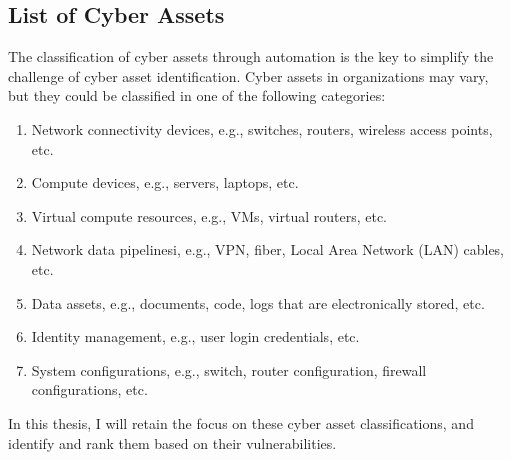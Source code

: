 \subsection{List of Cyber Assets}\label{sec:assets}
The classification of cyber assets through automation is the key to simplify the challenge of cyber asset identification. Cyber assets in organizations may vary, but they could be classified in one of the following categories:
\begin{enumerate}\label{ref:cyber_assets}
                \item Network connectivity devices, e.g., switches, routers, wireless access points, etc.
                \item Compute devices, e.g., servers, laptops, etc.
                \item Virtual compute resources, e.g., VMs, virtual routers, etc.
                \item Network data pipelinesi, e.g., VPN, fiber, Local Area Network (LAN) cables, etc.
                \item Data assets, e.g., documents, code, logs that are electronically stored, etc.
                \item Identity management, e.g., user login credentials, etc.
                \item System configurations, e.g., switch, router configuration, firewall configurations, etc.
\end{enumerate}

In this thesis, I will retain the focus on these cyber asset classifications, and identify and rank them based on their vulnerabilities.


